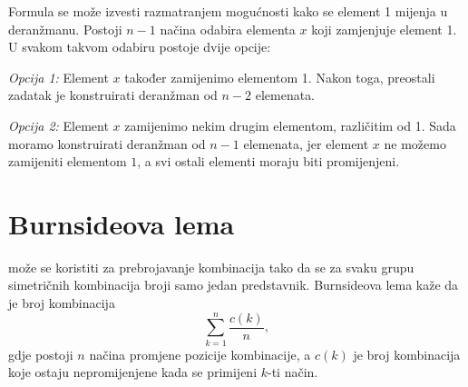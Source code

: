 Formula se može izvesti razmatranjem
mogućnosti kako se element 1 mijenja
u deranžmanu.
Postoji $n-1$ načina odabira elementa $x$
koji zamjenjuje element 1.
U svakom takvom odabiru postoje dvije opcije:

\textit{Opcija 1:} Element $x$ također zamijenimo
elementom 1.
Nakon toga, preostali zadatak je konstruirati
deranžman od $n-2$ elemenata.

\textit{Opcija 2:} Element $x$ zamijenimo
nekim drugim elementom, različitim od 1.
Sada moramo konstruirati deranžman
od $n-1$ elemenata, jer element
$x$ ne možemo zamijeniti elementom $1$, a svi ostali
elementi moraju biti promijenjeni.

\section{Burnsideova lema}


može se koristiti za prebrojavanje
kombinacija tako da se
za svaku grupu simetričnih kombinacija broji samo
jedan predstavnik.
Burnsideova lema kaže da je broj
kombinacija
\[\sum_{k=1}^n \frac{c(k)}{n},\]
gdje postoji $n$ načina promjene
pozicije kombinacije,
a $c(k)$ je broj kombinacija koje
ostaju nepromijenjene kada se primijeni $k$-ti način.

